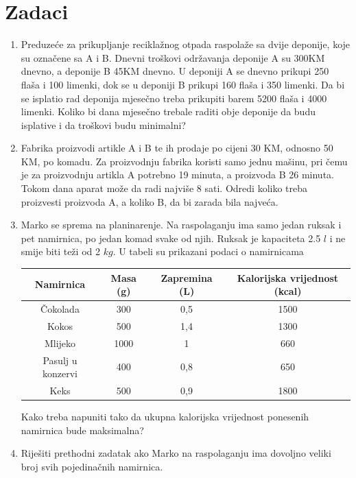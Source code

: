 \documentclass[a4paper, utf8, 11pt, colorlinks]{book}
\begin{document}
\section{Zadaci}
\begin{enumerate}
	
	\item Preduzeće za prikupljanje reciklažnog otpada raspolaže sa dvije deponije, koje su označene sa A i B. Dnevni troškovi održavanja deponije A su 300KM dnevno, a deponije B 45KM dnevno.  U deponiji A se dnevno prikupi 250 flaša i 100 limenki, dok se u deponiji B prikupi 160 flaša i 350 limenki. Da bi se isplatio rad deponija mjesečno treba prikupiti barem 5200 flaša i 4000 limenki.
	Koliko bi dana mjesečno trebale raditi obje deponije da budu isplative i da troškovi budu minimalni?
	
	\item Fabrika proizvodi artikle A i B te ih prodaje po cijeni 30 KM, odnosno 50 KM, po komadu. Za
	proizvodnju fabrika koristi samo jednu mašinu, pri čemu je za proizvodnju artikla A potrebno 19
	minuta, a proizvoda B 26 minuta. Tokom dana aparat može da radi najviše 8 sati. Odredi koliko treba
	proizvesti proizvoda A, a koliko B, da bi zarada bila najveća.
	
	\item Marko se sprema na planinarenje. Na raspolaganju ima samo jedan ruksak i pet namirnica, po jedan
	komad svake od njih. Ruksak je kapaciteta 2.5 $l$ i ne smije biti teži od 2 $kg$. U tabeli su
	prikazani podaci o namirnicama
	\begin{table}[H]
		\centering
		\begin{tabular}{|c|c|c|c|}
			\hline
			Namirnica & Masa (g) & Zapremina (L) & Kalorijska vrijednost (kcal) \\
			\hline
			Čokolada & 300 & 0,5 & 1500 \\
			\hline
			Kokos & 500 & 1,4 & 1300 \\
			\hline
			Mlijeko& 1000 & 1 & 660 \\
			\hline
			Pasulj u konzervi& 400 & 0,8 & 650 \\
			\hline
			Keks& 500 & 0,9 & 1800 \\
			\hline
		\end{tabular}
	\end{table}
	Kako treba napuniti tako da ukupna kalorijska vrijednost ponesenih namirnica bude maksimalna?
	
	\item Riješiti prethodni zadatak ako Marko na raspolaganju ima dovoljno veliki broj svih pojedinačnih namirnica.
	

\end{enumerate}
\end{document}
